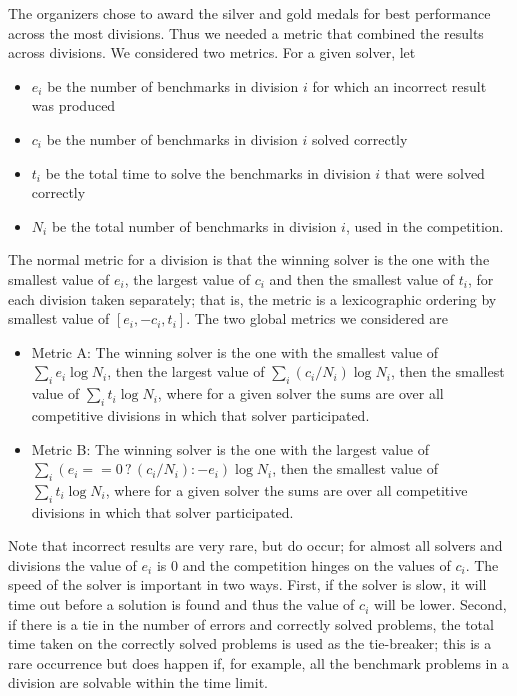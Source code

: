 \documentclass[twoside,11pt]{article}
\begin{document}
The organizers chose to award the silver and gold medals for best performance across the most divisions. Thus we needed a metric that combined the results across divisions. We considered two metrics. For a given solver, let 
\begin{itemize}[noitemsep,nolistsep]
\item $e_i$ be the number of benchmarks in division $i$ for which an incorrect result was produced
\item $c_i$ be the number of benchmarks in division $i$ solved correctly
\item $t_i$ be the total time to solve the benchmarks in division $i$ that were solved correctly
\item $N_i$ be the total number of benchmarks in division $i$, used in the competition.
\end{itemize}
The normal metric for a division is that the winning solver is the one with the
smallest value of $e_i$, the largest value of $c_i$ 
and then the smallest value of $t_i$, for each division taken separately; 
that is, the metric is a lexicographic ordering by smallest value of $[ e_i, -c_i, t_i ]$.
The two global metrics we considered are
\begin{itemize}[noitemsep,nolistsep]
\item Metric A: The winning solver is the one with the smallest value of $\sum_i e_i \log N_i$, then the largest value of $\sum_i (c_i/N_i) \log N_i$, then the smallest value of $\sum_i t_i \log N_i$, where for a given solver the sums are over all competitive divisions in which that solver participated.
\item Metric B: The winning solver is the one with the largest value of $\sum_i (e_i == 0\,?\,(c_i/N_i) : - e_i ) \log N_i$, then the smallest value of $\sum_i t_i \log N_i$, where for a given solver the sums are over all competitive divisions in which that solver participated.
\end{itemize}
Note that incorrect results are very rare, but do occur; for almost all solvers and divisions the value of $e_i$ is 0 and the competition hinges on the values of $c_i$. The speed of the solver is important in two ways. First, if the solver is slow, it will time out before a solution is found and thus the value of $c_i$ will be lower. Second, if there is a tie in the number of errors and correctly solved problems, the total time taken on the correctly solved problems is used as the tie-breaker; this is a rare occurrence but does happen if, for example, all the benchmark problems in a division are solvable within the time limit.
\end{document}
